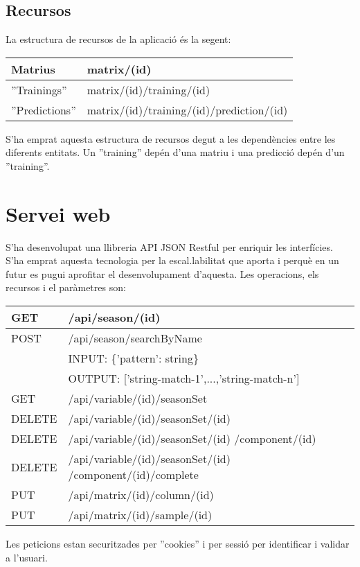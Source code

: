 \subsection{Recursos}
La estructura de recursos de la aplicaci\'{o} \'{e}s la segent:\\

\begin{tabular}{| l | l |}
\hline
Matrius       & matrix/(id) \\ \hline
''Trainings''  & matrix/(id)/training/(id) \\ \hline
''Predictions'' & matrix/(id)/training/(id)/prediction/(id) \\ \hline
\end{tabular}

S'ha emprat aquesta estructura de recursos degut a les dependències entre les diferents entitats. Un ''training'' dep\'{e}n d'una matriu i una predicci\'{o} dep\'{e}n d'un ''training''.

\section{Servei web}
S'ha desenvolupat una llibreria API JSON Restful\cite{apijson} per enriquir les interfícies. S'ha emprat aquesta tecnologia per la escal.labilitat que aporta i perquè en un futur es pugui aprofitar el desenvolupament d'aquesta.
Les operacions, els recursos i el paràmetres son:\\
\begin{tabular}{ | l | l |}
\hline
GET & /api/season/(id) \\ \hline
POST & /api/season/searchByName \\ \hline
     & INPUT: \{'pattern': string\} \\ \hline
     & OUTPUT: ['string-match-1',...,'string-match-n'] \\ \hline
GET & /api/variable/(id)/seasonSet \\ \hline
DELETE & /api/variable/(id)/seasonSet/(id)\\ \hline
DELETE & /api/variable/(id)/seasonSet/(id) /component/(id) \\ \hline
DELETE & /api/variable/(id)/seasonSet/(id) /component/(id)/complete\\ \hline
PUT & /api/matrix/(id)/column/(id)\\ \hline
PUT & /api/matrix/(id)/sample/(id)\\ \hline
\end{tabular}
Les peticions estan securitzades per ''cookies'' i per sessió per identificar i validar a l'usuari.

